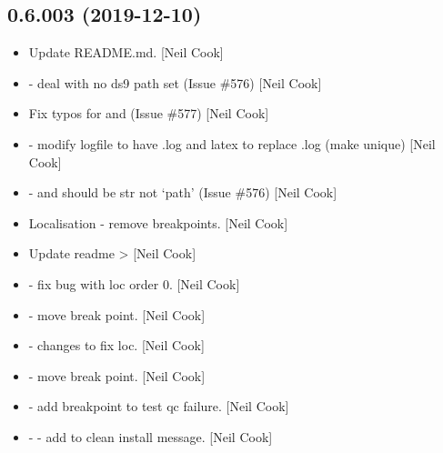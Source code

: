 \documentclass[a4paper,10pt,english]{report}
\begin{document}
\subsection{0.6.003 (2019-12-10)}
\label{\detokenize{misc/changelog:id15}}\begin{itemize}
\item {} 
Update README.md. {[}Neil Cook{]}

\item {} 
 - deal with no ds9 path set
(Issue \#576) {[}Neil Cook{]}

\item {} 
Fix typos for  and  (Issue \#577) {[}Neil Cook{]}

\item {} 
 - modify logfile to have .log
and latex to replace .log (make unique) {[}Neil Cook{]}

\item {} 
 -  and
 should be str not ‘path’ (Issue \#576) {[}Neil Cook{]}

\item {} 
Localisation - remove breakpoints. {[}Neil Cook{]}

\item {} 
Update readme  \textendash{}\textgreater{}  {[}Neil Cook{]}

\item {} 
 - fix bug with loc order 0. {[}Neil Cook{]}

\item {} 
 - move break point. {[}Neil Cook{]}

\item {} 
 - changes to fix loc. {[}Neil Cook{]}

\item {} 
 - move break point. {[}Neil Cook{]}

\item {} 
 - add breakpoint to test qc failure. {[}Neil Cook{]}

\item {} 
 -  - add to clean install
message. {[}Neil Cook{]}


\end{itemize}
\end{document}
